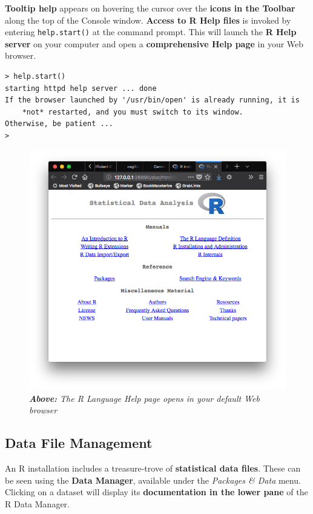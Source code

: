 \documentclass[]{book}
\theoremstyle{definition}
\theoremstyle{definition}
\theoremstyle{definition}
\theoremstyle{remark}
\begin{document}
\textbf{Tooltip help} appears on hovering the cursor over the
\textbf{icons in the Toolbar} along the top of the Console window.
\textbf{Access to R Help files} is invoked by entering
\texttt{help.start()} at the command prompt. This will launch the
\textbf{R Help server} on your computer and open a \textbf{comprehensive
Help page} in your Web browser.

\begin{verbatim}
> help.start()
starting httpd help server ... done
If the browser launched by '/usr/bin/open' is already running, it is
    *not* restarted, and you must switch to its window.
Otherwise, be patient ...
> 
\end{verbatim}

\begin{figure}
\centering
\includegraphics{images/R_Help.png}
\caption{\emph{\textbf{Above:} The R Language Help page opens in your
default Web browser}}
\end{figure}

\hypertarget{data-file-management}{%
\subsection{Data File Management}\label{data-file-management}}

An R installation includes a treasure-trove of \textbf{statistical data
files}. These can be seen using the \textbf{Data Manager}, available
under the \emph{Packages \& Data} menu. Clicking on a dataset will
display its \textbf{documentation in the lower pane} of the R Data
Manager.
\end{document}
